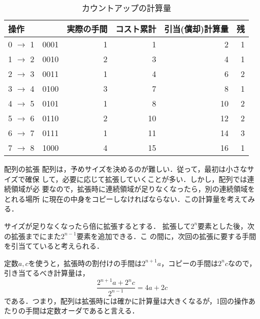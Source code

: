 \begin{table}
\begin{center}
 \caption{カウントアップの計算量}
\begin{tabular}{|l|r|r|r|r|r|}
\hline
操作 &  & 実際の手間 & コスト累計 & 引当(償却)計算量 & 残 \\
\hline
0 $\rightarrow$ 1 & 0001 & 1 & 1 & 2 & 1 \\
1 $\rightarrow$ 2 & 0010 & 2 & 3 & 4 & 1 \\
2 $\rightarrow$ 3 & 0011 & 1 & 4 & 6 & 2 \\
3 $\rightarrow$ 4 & 0100 & 3 & 7 & 8 & 1 \\
4 $\rightarrow$ 5 & 0101 & 1 & 8 & 10 & 2 \\
5 $\rightarrow$ 6 & 0110 & 2 & 10 & 12 & 2 \\
6 $\rightarrow$ 7 & 0111 & 1 & 11 & 14 & 3 \\
7 $\rightarrow$ 8 & 1000 & 4 & 15 & 16 & 1 \\
\end{tabular}
\end{center}
\end{table}

\iffalse
#+ORGTBL: SEND table1 orgtbl-to-latex
|--------+------+------------+------------+------------------+----|
| 操作   |      | 実際の手間 | コスト累計 | 引当(償却)計算量 | 残 |
|--------+------+------------+------------+------------------+----|
| 0 -> 1 | 0001 |          1 |          1 |                2 |  1 |
| 1 -> 2 | 0010 |          2 |          3 |                4 |  1 |
| 2 -> 3 | 0011 |          1 |          4 |                6 |  2 |
| 3 -> 4 | 0100 |          3 |          7 |                8 |  1 |
| 4 -> 5 | 0101 |          1 |          8 |               10 |  2 |
| 5 -> 6 | 0110 |          2 |         10 |               12 |  2 |
| 6 -> 7 | 0111 |          1 |         11 |               14 |  3 |
| 7 -> 8 | 1000 |          4 |         15 |               16 |  1 |
\fi

\begin{myexample}{配列の拡張}
 配列は，予めサイズを決めるのが難しい．従って，最初は小さなサイズで確保
 して，必要に応じて拡張していくことが多い．しかし，配列では連続領域が必
 要なので，拡張時に連続領域が足りなくなったら，別の連続領域をとれる場所
 に現在の中身をコピーしなければならない．この計算量を考えてみる．

 サイズが足りなくなったら倍に拡張するとする．
 拡張して$2^n$要素とした後，次の拡張までにまた$2^{n-1}$要素を追加できる．こ
 の間に，次回の拡張に要する手間を引当てていると考えられる．

定数$a, c$を使うと，拡張時の割付けの手間は$2^{n+1}a$，コピーの手間は$2^n
 c$なので，引き当てるべき計算量は，
\[
 \frac{2^{n+1} a + 2^n c}{2^{n-1}} = 4a + 2c
\]
である．つまり，配列は拡張時には確かに計算量は大きくなるが，1回の操作あ
 たりの手間は定数オーダであると言える．
\end{myexample}




